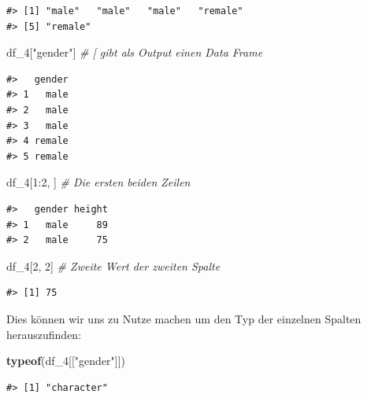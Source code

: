 \documentclass[]{tufte-book}
\newenvironment{Shaded}{}{}
\newcommand{\KeywordTok}[1]{\textcolor[rgb]{0.00,0.44,0.13}{\textbf{#1}}}
\newcommand{\DecValTok}[1]{\textcolor[rgb]{0.25,0.63,0.44}{#1}}
\newcommand{\StringTok}[1]{\textcolor[rgb]{0.25,0.44,0.63}{#1}}
\newcommand{\CommentTok}[1]{\textcolor[rgb]{0.38,0.63,0.69}{\textit{#1}}}
\newcommand{\OperatorTok}[1]{\textcolor[rgb]{0.40,0.40,0.40}{#1}}
\newcommand{\NormalTok}[1]{#1}
\begin{document}
\begin{verbatim}
#> [1] "male"   "male"   "male"   "remale"
#> [5] "remale"
\end{verbatim}

\begin{Shaded}
\begin{Highlighting}[]
\NormalTok{df_}\DecValTok{4}\NormalTok{[}\StringTok{"gender"}\NormalTok{]  }\CommentTok{# [ gibt als Output einen Data Frame}
\end{Highlighting}
\end{Shaded}

\begin{verbatim}
#>   gender
#> 1   male
#> 2   male
#> 3   male
#> 4 remale
#> 5 remale
\end{verbatim}

\begin{Shaded}
\begin{Highlighting}[]
\NormalTok{df_}\DecValTok{4}\NormalTok{[}\DecValTok{1}\OperatorTok{:}\DecValTok{2}\NormalTok{, ]  }\CommentTok{# Die ersten beiden Zeilen}
\end{Highlighting}
\end{Shaded}

\begin{verbatim}
#>   gender height
#> 1   male     89
#> 2   male     75
\end{verbatim}

\begin{Shaded}
\begin{Highlighting}[]
\NormalTok{df_}\DecValTok{4}\NormalTok{[}\DecValTok{2}\NormalTok{, }\DecValTok{2}\NormalTok{]  }\CommentTok{# Zweite Wert der zweiten Spalte}
\end{Highlighting}
\end{Shaded}

\begin{verbatim}
#> [1] 75
\end{verbatim}

Dies können wir uns zu Nutze machen um den Typ der einzelnen Spalten
herauszufinden:

\begin{Shaded}
\begin{Highlighting}[]
\KeywordTok{typeof}\NormalTok{(df_}\DecValTok{4}\NormalTok{[[}\StringTok{"gender"}\NormalTok{]])}
\end{Highlighting}
\end{Shaded}

\begin{verbatim}
#> [1] "character"
\end{verbatim}
\end{document}
